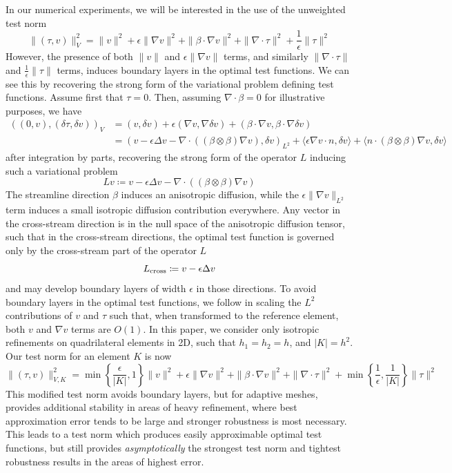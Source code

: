\documentclass[11pt,onecolumn]{scrartcl}
\newcommand{\grad}{\nabla}
\renewcommand{\div}{\grad \cdot}
\begin{document}
In our numerical experiments, we will be interested in the use of the unweighted test norm 
\[
\|\left(\tau, v\right)\|_{V}^2 = \|v\|^2 + \epsilon \|\grad v\|^2 + \|\beta \cdot \grad v\|^2 + \| \div \tau\|^2 + \frac{1}{\epsilon}\|\tau\|^2
\]
However, the presence of both $\|v\|$ and $\epsilon\|\grad v\|$ terms, and similarly $\|\div \tau\|$ and $\frac{1}{\epsilon}\|\tau\|$ terms, induces boundary layers in the optimal test functions. We can see this by recovering the strong form of the variational problem defining test functions. Assume first that $\tau = 0$. Then, assuming $\div \beta = 0$ for illustrative purposes, we have 
\begin{align*}
\left(\left(0,v\right),\left(\delta\tau,\delta v\right)\right)_{V} &= (v,\delta v) + \epsilon \left(\grad v,\grad \delta v\right) + \left(\beta \cdot \grad v, \beta \cdot \grad \delta v\right)\\
&= \left(v - \epsilon \Delta v - \div \left(\left(\beta \otimes \beta\right) \grad v\right), \delta v\right)_{L^2} + \langle \epsilon \grad v\cdot n, \delta v\rangle + \langle n\cdot \left(\beta\otimes\beta\right) \grad v , \delta v\rangle
\end{align*}
after integration by parts, recovering the strong form of the operator $L$ inducing such a variational problem 
\[
Lv \coloneqq v - \epsilon \Delta v - \div \left(\left(\beta \otimes \beta\right) \grad v\right)
\]
The streamline direction $\beta$ induces an anisotropic diffusion, while the $\epsilon\|\grad v\|_{L^2}$ term induces a small isotropic diffusion contribution everywhere. Any vector in the cross-stream direction is in the null space of the anisotropic diffusion tensor, such that in the cross-stream directions, the optimal test function is governed only by the cross-stream part of the operator $L$
\[
L_{\rm cross} \coloneqq v - \epsilon \Delta v 
\]
and may develop boundary layers of width $\epsilon$ in those directions. To avoid boundary layers in the optimal test functions, we follow \cite{DPGrobustness} in scaling the $L^2$ contributions of $v$ and $\tau$ such that, when transformed to the reference element, both $v$ and $\grad v$ terms are $O(1)$.  In this paper, we consider only isotropic refinements on quadrilateral elements in 2D, such that $h_1 = h_2 = h$, and $|K| = h^2$. Our test norm for an element $K$ is now
\[
\|\left(\tau, v\right)\|_{V,K}^2 = \min\left\{\frac{\epsilon}{|K|},1\right\}\|v\|^2 + \epsilon \|\grad v\|^2 + \|\beta \cdot \grad v\|^2 + \| \div \tau\|^2 + \min\left\{\frac{1}{\epsilon},\frac{1}{|K|}\right\}\|\tau\|^2
\]
This modified test norm avoids boundary layers, but for adaptive meshes, provides additional stability in areas of heavy refinement, where best approximation error tends to be large and stronger robustness is most necessary.  This leads to a test norm which produces easily approximable optimal test functions, but still provides \textit{asymptotically} the strongest test norm and tightest robustness results in the areas of highest error.  
\end{document}
